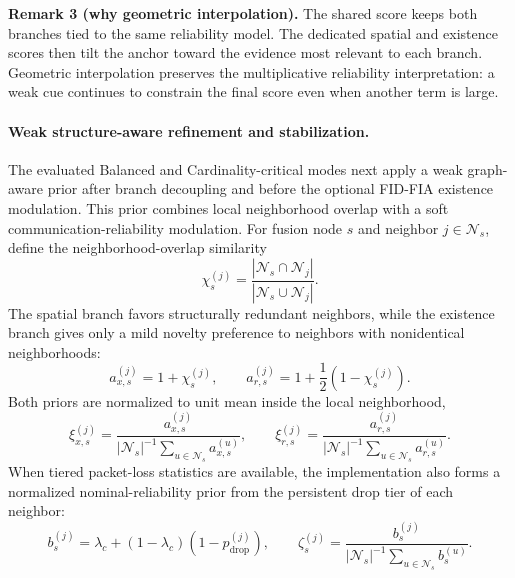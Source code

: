 \noindent\textbf{Remark 3 (why geometric interpolation).}
The shared score keeps both branches tied to the same reliability model. The dedicated spatial and existence scores then tilt the anchor toward the evidence most relevant to each branch. Geometric interpolation preserves the multiplicative reliability interpretation: a weak cue continues to constrain the final score even when another term is large.

\paragraph{Weak structure-aware refinement and stabilization.}

The evaluated Balanced and Cardinality-critical modes next apply a weak graph-aware prior after branch decoupling and before the optional FID-FIA existence modulation. This prior combines local neighborhood overlap with a soft communication-reliability modulation. For fusion node $s$ and neighbor $j\in\mathcal{N}_s$, define the neighborhood-overlap similarity
\begin{equation}
\label{eq:method-neighborhood-overlap}
\chi_s^{(j)}
=
\frac{|\mathcal{N}_s \cap \mathcal{N}_j|}
{|\mathcal{N}_s \cup \mathcal{N}_j|}.
\end{equation}
The spatial branch favors structurally redundant neighbors, while the existence branch gives only a mild novelty preference to neighbors with nonidentical neighborhoods:
\begin{equation}
\label{eq:method-structure-base-prior}
a_{x,s}^{(j)} = 1+\chi_s^{(j)},
\qquad
a_{r,s}^{(j)} = 1+\frac{1}{2}\left(1-\chi_s^{(j)}\right).
\end{equation}
Both priors are normalized to unit mean inside the local neighborhood,
\begin{equation}
\label{eq:method-structure-normalized-prior}
\xi_{x,s}^{(j)}
=
\frac{a_{x,s}^{(j)}}{|\mathcal{N}_s|^{-1}\sum_{u\in\mathcal{N}_s}a_{x,s}^{(u)}},
\qquad
\xi_{r,s}^{(j)}
=
\frac{a_{r,s}^{(j)}}{|\mathcal{N}_s|^{-1}\sum_{u\in\mathcal{N}_s}a_{r,s}^{(u)}}.
\end{equation}
When tiered packet-loss statistics are available, the implementation also forms a normalized nominal-reliability prior from the persistent drop tier of each neighbor:
\begin{equation}
\label{eq:method-structure-comm-prior}
b_s^{(j)}
=
\lambda_c+(1-\lambda_c)\left(1-p_{\mathrm{drop}}^{(j)}\right),
\qquad
\zeta_s^{(j)}
=
\frac{b_s^{(j)}}{|\mathcal{N}_s|^{-1}\sum_{u\in\mathcal{N}_s}b_s^{(u)}}.
\end{equation}
